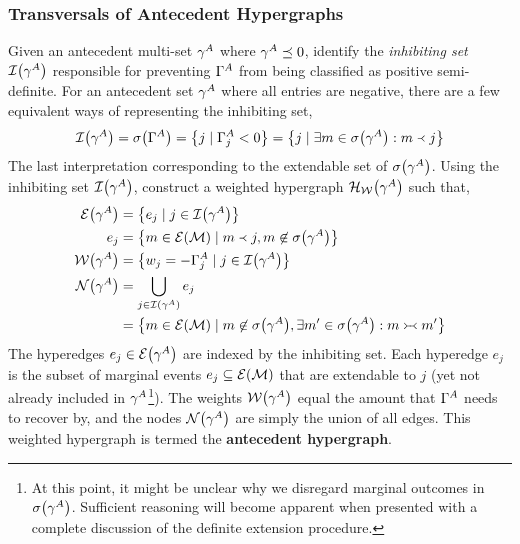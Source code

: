 \documentclass[aps, 10pt, english, twoside, pra, nofootinbib, longbibliography]{revtex4-1}
\theoremstyle{plain}
\theoremstyle{definition}
\theoremstyle{remark}
\newcommand{\hgraph}{\mathcal{H}}
\newcommand{\nodes}{\mathcal{N}}
\newcommand{\weights}{\mathcal{W}}
\newcommand{\edges}{\mathcal{E}}
\newcommand{\inhibit}{\mathcal{I}}
\newcommand{\com}{\mathrel{\Yright\hspace{-0.2em}\Yleft}}
\newcommand{\ext}{\mathrel{\Yleft}}
\newcommand{\mscenario}{\mathcal{M}}
\newcommand{\supp}[1]{\si\br{#1}}
\newcommand{\term}[1]{\textcolor{Mahogany}{\textbf{#1}}}
\newcommand{\Events}[1]{\s{E}\br{#1}} %
\begin{document}
    \subsubsection{Transversals of Antecedent Hypergraphs}
    Given an antecedent multi-set $\gamma^{A}$ where $\gamma^{A} \preceq 0$, identify the \textit{inhibiting set} $\inhibit\br{\ga^{A}}$ responsible for preventing $\Gamma^{A}$ from being classified as positive semi-definite. For an antecedent set $\gamma^{A}$ where all entries are negative, there are a few equivalent ways of representing the inhibiting set,
    \[ \inhibit\br{\ga^{A}} = \supp{\Ga^{A}} = \bc{j \mid \Ga^A_j < 0} = \bc{j \mid \exists m \in \supp{\ga^A} : m \ext j } \]
    The last interpretation corresponding to the extendable set of $\supp{\ga^{A}}$. Using the inhibiting set $\inhibit\br{\ga^{A}}$, construct a weighted hypergraph $\hgraph_\weights\br{\ga^A}$ such that,
    \begin{align*}
    \edges\br{\ga^{A}} &= \bc{e_j \mid j \in \inhibit\br{\ga^{A}}} \\
    e_j &= \bc{m \in \Events{\mscenario} \mid m \ext j, m \not \in \supp{\ga^A}} \\
    \weights\br{\ga^{A}} &= \bc{w_j = - \Ga^{A}_j \mid j \in \inhibit\br{\ga^{A}}} \\
    \nodes\br{\ga^A} &= \bigcup_{j \in \inhibit\br{\ga^A}} e_j \\
    &= \bc{m \in \Events{\mscenario} \mid m \not \in \supp{\ga^A}, \exists m' \in \supp{\ga^A} : m \com m'}
    \end{align*}
    The hyperedges $e_j \in \edges\br{\ga^{A}}$ are indexed by the inhibiting set. Each hyperedge $e_j$ is the subset of marginal events $e_j \subseteq \Events{\mscenario}$ that are extendable to $j$ (yet not already included in $\gamma^A$\footnote{At this point, it might be unclear why we disregard marginal outcomes in $\supp{\ga^A}$. Sufficient reasoning will become apparent when presented with a complete discussion of the definite extension procedure.}). The weights $\weights\br{\ga^A}$ equal the amount that $\Gamma^{A}$ needs to recover by, and the nodes $\nodes\br{\ga^A}$ are simply the union of all edges. This weighted hypergraph is termed the \term{antecedent hypergraph}.
\end{document}
